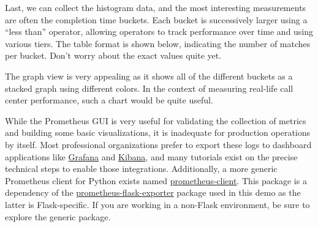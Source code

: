 
Last, we can collect the histogram data, and the most interesting measurements
are often the completion time buckets. Each bucket is successively larger using
a ``less than'' operator, allowing operators to track performance over time and
using various tiers. The table format is shown below, indicating the number
of matches per bucket. Don't worry about the exact values quite yet.


The graph view is very appealing as it shows all of the different buckets
as a stacked graph using different colors. In the context of measuring
real-life call center performance, such a chart would be quite useful.


While the Prometheus GUI is very useful for validating the collection
of metrics and building some basic visualizations, it is inadequate
for production operations by itself. Most professional organizations
prefer to export these logs to dashboard applications like
\href{https://grafana.com/}{Grafana} and
\href{https://www.elastic.co/kibana}{Kibana}, and many tutorials
exist on the precise technical steps to enable those integrations.
Additionally, a more generic Prometheus client for Python exists named
\href{https://pypi.org/project/prometheus-client}{prometheus-client}.
This package is a dependency of the 
\href{https://pypi.org/project/prometheus-flask-exporter}{prometheus-flask-exporter}
package used in this demo as the latter is Flask-specific. If you are working
in a non-Flask environment, be sure to explore the generic package.
